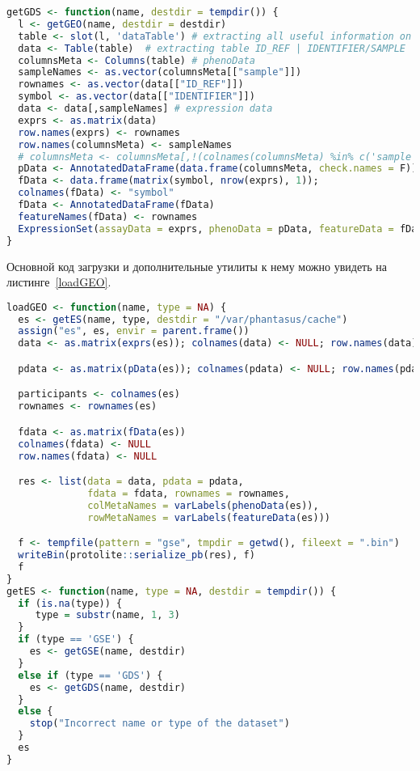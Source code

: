 \begin{lstlisting}[float=!h,caption={Загрузка данных типа GDS из Gene Expression Omnibus},label={getGDS},language=R]
 getGDS <- function(name, destdir = tempdir()) {
  l <- getGEO(name, destdir = destdir)
  table <- slot(l, 'dataTable') # extracting all useful information on dataset
  data <- Table(table)  # extracting table ID_REF | IDENTIFIER/SAMPLE | SAMPLE1 | ...
  columnsMeta <- Columns(table) # phenoData
  sampleNames <- as.vector(columnsMeta[["sample"]])
  rownames <- as.vector(data[["ID_REF"]])
  symbol <- as.vector(data[["IDENTIFIER"]])
  data <- data[,sampleNames] # expression data
  exprs <- as.matrix(data)
  row.names(exprs) <- rownames
  row.names(columnsMeta) <- sampleNames
  # columnsMeta <- columnsMeta[,!(colnames(columnsMeta) %in% c('sample'))] 
  pData <- AnnotatedDataFrame(data.frame(columnsMeta, check.names = F))
  fData <- data.frame(matrix(symbol, nrow(exprs), 1));
  colnames(fData) <- "symbol"
  fData <- AnnotatedDataFrame(fData)
  featureNames(fData) <- rownames
  ExpressionSet(assayData = exprs, phenoData = pData, featureData = fData)
}
\end{lstlisting}

Основной код загрузки и дополнительные утилиты к нему можно увидеть на листинге~\ref{loadGEO}.

\begin{lstlisting}[float=!h,caption={Загрузка данных из Gene Expression Omnibus},label={loadGEO},language=R]
loadGEO <- function(name, type = NA) {
  es <- getES(name, type, destdir = "/var/phantasus/cache")
  assign("es", es, envir = parent.frame())
  data <- as.matrix(exprs(es)); colnames(data) <- NULL; row.names(data) <- NULL

  pdata <- as.matrix(pData(es)); colnames(pdata) <- NULL; row.names(pdata) <- NULL

  participants <- colnames(es)
  rownames <- rownames(es)

  fdata <- as.matrix(fData(es))
  colnames(fdata) <- NULL
  row.names(fdata) <- NULL

  res <- list(data = data, pdata = pdata,
              fdata = fdata, rownames = rownames,
              colMetaNames = varLabels(phenoData(es)),
              rowMetaNames = varLabels(featureData(es)))

  f <- tempfile(pattern = "gse", tmpdir = getwd(), fileext = ".bin")
  writeBin(protolite::serialize_pb(res), f)
  f
}
getES <- function(name, type = NA, destdir = tempdir()) {
  if (is.na(type)) {
     type = substr(name, 1, 3)
  }
  if (type == 'GSE') {
    es <- getGSE(name, destdir)
  }
  else if (type == 'GDS') {
    es <- getGDS(name, destdir)
  }
  else {
    stop("Incorrect name or type of the dataset")
  } 
  es
}
\end{lstlisting}


